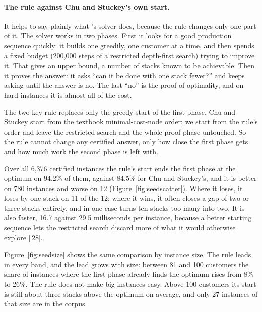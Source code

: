 \documentclass[11pt,a4paper]{article}
\renewcommand{\S}[1]{[\textsection\,#1]}
\begin{document}
\paragraph{The rule against Chu and Stuckey's own start.}
It helps to say plainly what \citet{ChuStuckey2009}'s solver does, because
the rule changes only one part of it. The solver works in two phases. First
it looks for a good production sequence quickly: it builds one greedily, one
customer at a time, and then spends a fixed budget (200{,}000 steps of a
restricted depth-first search) trying to improve it. That gives an upper
bound, a number of stacks known to be achievable. Then it proves the answer:
it asks ``can it be done with one stack fewer?'' and keeps asking until the
answer is no. The last ``no'' is the proof of optimality, and on hard
instances it is almost all of the cost.

The two-key rule replaces only the greedy start of the first phase. Chu and
Stuckey start from the textbook minimal-cost-node order; we start from the
rule's order and leave the restricted search and the whole proof phase
untouched. So the rule cannot change any certified answer, only how close
the first phase gets and how much work the second phase is left with.

Over all 6,376 certified instances the rule's start ends the first phase at
the optimum on 94.2\% of them, against 84.5\% for Chu and Stuckey's, and it
is better on 780 instances and worse on 12 (Figure~\ref{fig:seedscatter}).
Where it loses, it loses by one stack on 11 of the 12; where it wins, it
often closes a gap of two or three stacks entirely, and in one case turns
ten stacks too many into two. It is also faster, 16.7 against 29.5
milliseconds per instance, because a better starting sequence lets the
restricted search discard more of what it would otherwise explore \S{28}.

Figure~\ref{fig:seedsize} shows the same comparison by instance size. The
rule leads in every band, and the lead grows with size: between 81 and 100
customers the share of instances where the first phase already finds the
optimum rises from 8\% to 26\%. The rule does not make big instances easy.
Above 100 customers its start is still about three stacks above the optimum
on average, and only 27 instances of that size are in the corpus.
\end{document}
